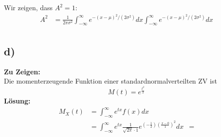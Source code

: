 \documentclass{article}
\begin{document}
Wir zeigen, dass $A^2 = 1$: 
\begin{align*}
    A^2 &= \frac{1}{2\pi \sigma^2} \int_{-\infty}^{\infty} e^{-(x-\mu)^2/(2\sigma^2)} dx \int_{-\infty}^{\infty} e^{-(x-\mu)^2/(2\sigma^2)} dx \\ 
\end{align*}
\subsection*{d)}
\textbf{Zu Zeigen:}\\

Die momenterzeugende Funktion einer standardnormalverteilten ZV ist \[M(t) = e^{\frac{t^2}{2}}\]
\textbf{Lösung:}\\

\begin{align*}
    M_X(t) &= \int_{-\infty}^{\infty} e^{tx}f(x) dx \\
    &= \int_{-\infty}^{\infty} e^{tx} \frac{1}{\sqrt{2\pi} \cdot 1} e^{\left(-\frac{1}{2}\right)\left(\frac{x- 0}{1}\right)^2} dx
    &= 
\end{align*}
\end{document}
